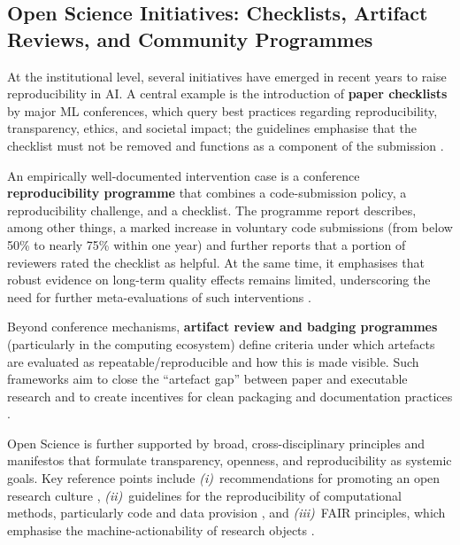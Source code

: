 \documentclass[12pt, a4paper]{article}
\begin{document}
\subsection{Open Science Initiatives: Checklists, Artifact Reviews, and
            Community Programmes}
\label{sec:openscience}

At the institutional level, several initiatives have emerged in recent
years to raise reproducibility in AI.  A central example is the
introduction of \textbf{paper checklists} by major ML conferences, which
query best practices regarding reproducibility, transparency, ethics,
and societal impact; the guidelines emphasise that the checklist must not
be removed and functions as a component of the submission
\cite{NeurIPSChecklist2023}.

An empirically well-documented intervention case is a conference
\textbf{reproducibility programme} that combines a code-submission
policy, a reproducibility challenge, and a checklist.  The programme
report describes, among other things, a marked increase in voluntary
code submissions (from below 50\% to nearly 75\% within one year) and
further reports that a portion of reviewers rated the checklist as
helpful.  At the same time, it emphasises that robust evidence on
long-term quality effects remains limited, underscoring the need for
further meta-evaluations of such interventions \cite{Pineau2021}.

Beyond conference mechanisms, \textbf{artifact review and badging
programmes} (particularly in the computing ecosystem) define criteria
under which artefacts are evaluated as repeatable/reproducible and how
this is made visible.  Such frameworks aim to close the ``artefact gap''
between paper and executable research and to create incentives for clean
packaging and documentation practices \cite{ACMArtifactReview2020}.

Open Science is further supported by broad, cross-disciplinary
principles and manifestos that formulate transparency, openness, and
reproducibility as systemic goals.  Key reference points include
\emph{(i)}~recommendations for promoting an open research culture
\cite{Nosek2015}, \emph{(ii)}~guidelines for the reproducibility of
computational methods, particularly code and data provision
\cite{Stodden2016,Peng2011}, and \emph{(iii)}~FAIR principles, which
emphasise the machine-actionability of research objects
\cite{Wilkinson2016}.
\end{document}
